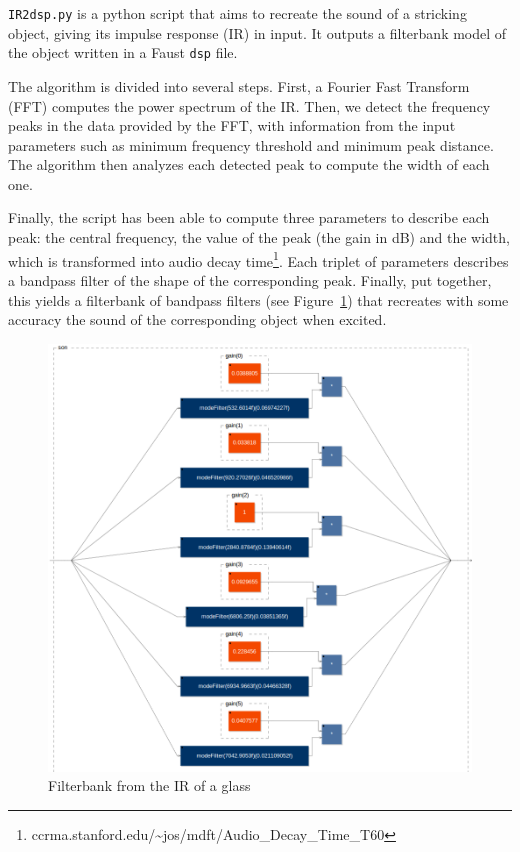 \documentclass[11pt,a4paper]{article}
\begin{document}
\texttt{IR2dsp.py} is a python script that aims to recreate the sound of a stricking object, giving its impulse response (IR) in input. It outputs a filterbank model of the object written in a Faust \texttt{dsp} file.

The algorithm is divided into several steps. First, a Fourier Fast Transform (FFT) computes the power spectrum of the IR. Then, we detect the frequency peaks in the data provided by the FFT, with information from the input parameters such as minimum frequency threshold and minimum peak distance. The algorithm then analyzes each detected peak to compute the width of each one.

Finally, the script has been able to compute three parameters to describe each peak: the central frequency, the value of the peak (the gain in dB) and the width, which is transformed into audio decay time\footnote{ccrma.stanford.edu/\~{}jos/mdft/Audio\_Decay\_Time\_T60}. Each triplet of parameters describes a bandpass filter of the shape of the corresponding peak. Finally, put together, this yields a filterbank of bandpass filters (see Figure~\ref{fig:filterbank}) that recreates with some accuracy the sound of the corresponding object when excited.

\begin{figure}[h]
	\centering
	\includegraphics[scale=0.2]{pictures/filterbankdiagram.png}
	\caption{Filterbank from the IR of a glass}
	\label{fig:filterbank}
\end{figure}
\end{document}
